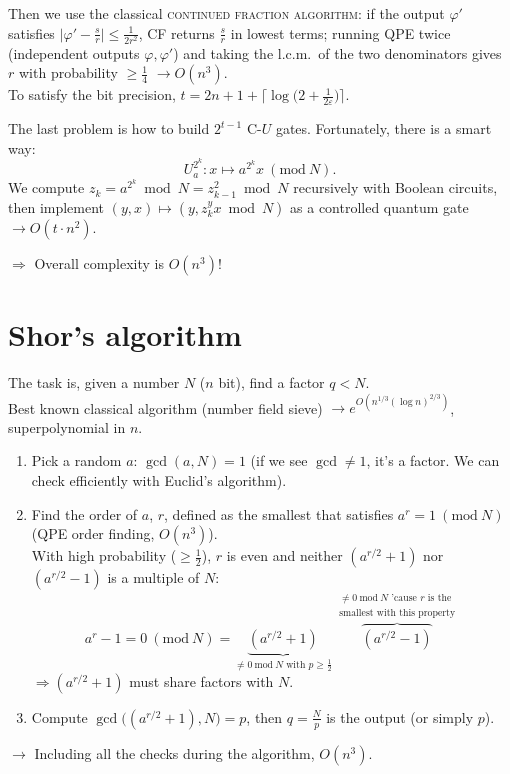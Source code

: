 \documentclass[11pt,a4paper]{article}
\begin{document}
Then we use the classical \textsc{continued fraction algorithm}: if the output $\varphi'$ satisfies $\bigl|\varphi' - \frac sr\bigr| \le \frac{1}{2r^2}$, CF returns $\frac sr$ in lowest terms; running QPE twice (independent outputs $\varphi,\varphi'$) and taking the l.c.m.\ of the two denominators gives $r$ with probability $\ge\frac14$ $\to O(n^3)$.\\
To satisfy the bit precision, $t = 2n+1+\bigl\lceil\log\bigl(2+\frac{1}{2\varepsilon}\bigr)\bigr\rceil$.

The last problem is how to build $2^{t-1}$ C-$U$ gates. Fortunately, there is a smart way:
\[
U_a^{2^k}: x\mapsto a^{2^k}x\ (\mathrm{mod}\ N).
\]
We compute $z_k = a^{2^k}\bmod N = z_{k-1}^2\bmod N$ recursively with Boolean circuits, then implement $(y,x)\mapsto(y, z_k^yx\bmod N)$ as a controlled quantum gate $\to O(t\cdot n^2)$.

$\Rightarrow$ Overall complexity is $\boxed{O(n^3)}$!

\section{Shor's algorithm}

The task is, given a number $N$ ($n$ bit), find a factor $q<N$.\\
Best known classical algorithm (number field sieve) $\to e^{O(n^{1/3}(\log n)^{2/3})}$, superpolynomial in $n$.
\begin{enumerate}
  \item Pick a random $a$: $\gcd(a,N)=1$ (if we see $\gcd\neq1$, it's a factor. We can check efficiently with Euclid's algorithm).
  \item Find the order of $a$, $r$, defined as the smallest that satisfies $a^r = 1\ (\mathrm{mod}\ N)$ (QPE order finding, $O(n^3)$).\\
  With high probability ($\ge\frac12$), $r$ is even and neither $(a^{r/2}+1)$ nor $(a^{r/2}-1)$ is a multiple of $N$:
  \[
  a^r - 1 = 0\ (\mathrm{mod}\ N) = \underbrace{(a^{r/2}+1)}_{\neq0\ \mathrm{mod}\ N\text{ with }p\ge\frac12}\ \overbrace{(a^{r/2}-1)}^{\substack{\neq0\ \mathrm{mod}\ N\text{ 'cause }r\text{ is the}\\ \text{smallest with this property}}}
  \]
  $\Rightarrow (a^{r/2}+1)$ must share factors with $N$.
  \item Compute $\gcd\bigl((a^{r/2}+1),N\bigr) = p$, then $q = \frac Np$ is the output (or simply $p$).
\end{enumerate}
$\to$ Including all the checks during the algorithm, $O(n^3)$.
\end{document}
